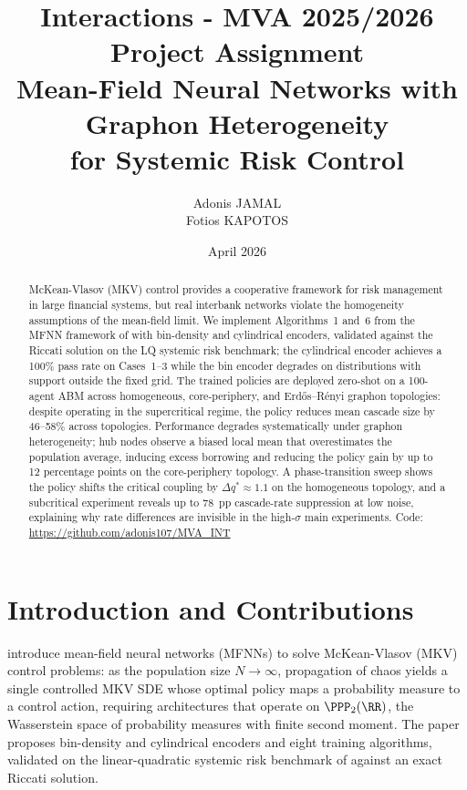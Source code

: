 \documentclass[11pt]{article}
\title{Interactions - MVA 2025/2026
      \\ \Large{Project Assignment}
      \\ \Large{Mean-Field Neural Networks with Graphon Heterogeneity \\ for Systemic Risk Control}}
\author{
Adonis JAMAL \email{adonis.jamal@student-cs.fr}\\
Fotios KAPOTOS \email{fotiskapotos@gmail.com}
}
\date{April 2026}
\begin{document}
\maketitle


\begin{abstract}
McKean-Vlasov (MKV) control provides a cooperative framework for risk management in large financial systems, but real interbank networks violate the homogeneity assumptions of the mean-field limit. We implement Algorithms~1 and~6 from the MFNN framework of \citet{pham2024mfnn} with bin-density and cylindrical encoders, validated against the Riccati solution on the LQ systemic risk benchmark; the cylindrical encoder achieves a 100\% pass rate on Cases~1--3 while the bin encoder degrades on distributions with support outside the fixed grid. The trained policies are deployed zero-shot on a 100-agent ABM across homogeneous, core-periphery, and Erd\H{o}s--R\'enyi graphon topologies: despite operating in the supercritical regime, the policy reduces mean cascade size by 46--58\% across topologies. Performance degrades systematically under graphon heterogeneity; hub nodes observe a biased local mean that overestimates the population average, inducing excess borrowing and reducing the policy gain by up to 12 percentage points on the core-periphery topology. A phase-transition sweep shows the policy shifts the critical coupling by $\Delta q^* \approx 1.1$ on the homogeneous topology, and a subcritical experiment reveals up to 78~pp cascade-rate suppression at low noise, explaining why rate differences are invisible in the high-$\sigma$ main experiments. Code: \url{https://github.com/adonis107/MVA_INT}
\end{abstract}


\section{Introduction and Contributions}

\citet{pham2024mfnn} introduce mean-field neural networks (MFNNs) to solve McKean-Vlasov (MKV) control problems: as the population size $N \to \infty$, propagation of chaos \citep{sznitman1991propagation} yields a single controlled MKV SDE whose optimal policy maps a probability measure to a control action, requiring architectures that operate on $\PPP_2(\RR)$, the Wasserstein space of probability measures with finite second moment. The paper proposes bin-density and cylindrical encoders and eight training algorithms, validated on the linear-quadratic systemic risk benchmark of \citet{carmona2015systemic} against an exact Riccati solution.
\end{document}

